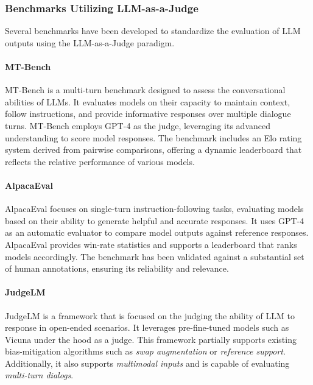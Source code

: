 \documentclass[sigconf, authoryear]{acmart}
\begin{document}
\subsubsection{Benchmarks Utilizing LLM-as-a-Judge}


Several benchmarks have been developed to standardize the evaluation of LLM outputs using the LLM-as-a-Judge paradigm.

\paragraph{MT-Bench}


MT-Bench is a multi-turn benchmark designed to assess the conversational abilities of LLMs.
It evaluates models on their capacity to maintain context, follow instructions, and provide informative responses over multiple dialogue turns.
MT-Bench employs GPT-4 as the judge, leveraging its advanced understanding to score model responses.
The benchmark includes an Elo rating system derived from pairwise comparisons, offering a dynamic leaderboard that reflects the relative performance of various models\cite{mtbench}.

\paragraph{AlpacaEval}


AlpacaEval focuses on single-turn instruction-following tasks, evaluating models based on their ability to generate helpful and accurate responses.
It uses GPT-4 as an automatic evaluator to compare model outputs against reference responses.
AlpacaEval provides win-rate statistics and supports a leaderboard that ranks models accordingly.
The benchmark has been validated against a substantial set of human annotations, ensuring its reliability and relevance\cite{alpaca_eval}.

\paragraph{JudgeLM}
JudgeLM is a framework that is focused on the judging the ability of LLM to response in open-ended scenarios.
It leverages pre-fine-tuned models such as Vicuna under the hood as a judge.
This framework partially supports existing bias-mitigation algorithms such as \textit{swap augmentation} or \textit{reference support}.
Additionally, it also supports \textit{multimodal inputs} and is capable of evaluating \textit{multi-turn dialogs}.
\end{document}
